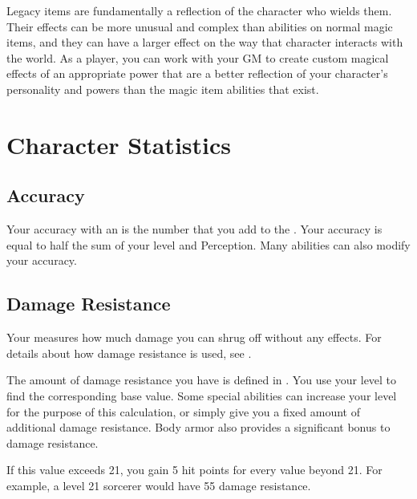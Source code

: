             Legacy items are fundamentally a reflection of the character who wields them.
            Their effects can be more unusual and complex than abilities on normal magic items, and they can have a larger effect on the way that character interacts with the world.
            As a player, you can work with your GM to create custom magical effects of an appropriate power that are a better reflection of your character's personality and powers than the magic item abilities that exist.

\section{Character Statistics}\label{Character Statistics}

    \subsection{Accuracy}\label{Accuracy}
        Your accuracy with an  is the number that you add to the .
        Your accuracy is equal to half the sum of your level and Perception.
        Many abilities can also modify your accuracy.

    \subsection{Damage Resistance}\label{Damage Resistance}
        Your  measures how much damage you can shrug off without any effects.
        For details about how damage resistance is used, see .

        The amount of damage resistance you have is defined in .
        You use your level to find the corresponding base value.
        Some special abilities can increase your level for the purpose of this calculation, or simply give you a fixed amount of additional damage resistance.
        Body armor also provides a significant bonus to damage resistance.

        If this value exceeds 21, you gain 5 hit points for every value beyond 21.
        For example, a level 21 sorcerer would have 55 damage resistance.

